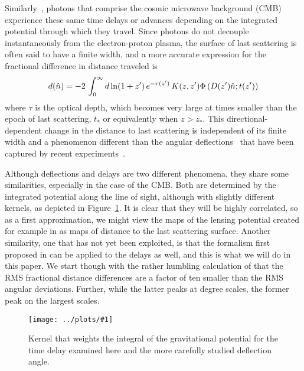 \documentclass[prl,amsmath,amssymb,floatfix,superscriptaddress,nofootinbib,twocolumn]{revtex4-1}
\def\be{\begin{equation}}
\def\ee{\end{equation}}
\newcommand{\sfig}[2]{
\texttt{[image: ../plots/\#1]}
        }
\newcommand{\Sfig}[2]{
   \begin{figure}[thbp]
   \begin{center}
    \sfig{#1.pdf}{0.9\columnwidth}
    \caption{{\small #2}}
    \label{fig:#1}
     \end{center}
   \end{figure}
}
\newcommand{\rf}[1]{\ref{fig:#1}}
\begin{document}
Similarly~\cite{Hu:2001yq}, photons that comprise the cosmic microwave background (CMB) experience these same time delays or advances depending on the integrated potential through which they travel. Since photons do not decouple instantaneously from the electron-proton plasma, the surface of last scattering is often said to have a finite width, and a more accurate expression for the fractional difference in distance traveled is
\be
\fd(\hat n) = -2\, \int_0^{\infty} d\ln(1+z')\, e^{-\tau(z')}\, K(z,z')\Phi\left(D(z')\hat n; t(z')\right)
\ee
where $\tau$ is the optical depth, which becomes very large at times smaller than the epoch of  last scattering, $t_*$ or equivalently when $z>z_*$.
This directional-dependent change in the distance to last scattering is independent of its finite width and a phenomenon different than the angular deflections~\cite{Hu:2001tn,Lewis:2006fu} that have been captured by recent experiments~\cite{Smith:2007rg,Ade:2013tyw,Story:2014hni,Sherwin:2016tyf,Aghanim:2018oex}.

Although deflections and delays are two different phenomena, they share some similarities, especially in the case of the CMB. Both are determined by the integrated potential along the line of sight, although with slightly different kernels, as depicted in Figure~\rf{kernel}. It is clear that they will be highly correlated, so as a first approximation, we might view the maps of the lensing potential created for example in \citet{Aghanim:2018oex} as maps of distance to the last scattering surface. Another similarity, one that has not yet been exploited, is that the formalism first proposed in \citet{Hu:2001tn} can be applied to the delays as well, and this is what we will do in this paper. We start though with the rather humbling calculation of \citet{Hu:2001yq} that the RMS fractional distance differences are a factor of ten smaller than the RMS angular deviations. Further, while the latter peaks at degree scales, the former peak on the largest scales.

\Sfig{kernel}{Kernel that weights the integral of the gravitational potential for the time delay examined here and the more carefully studied deflection angle.}
\end{document}
